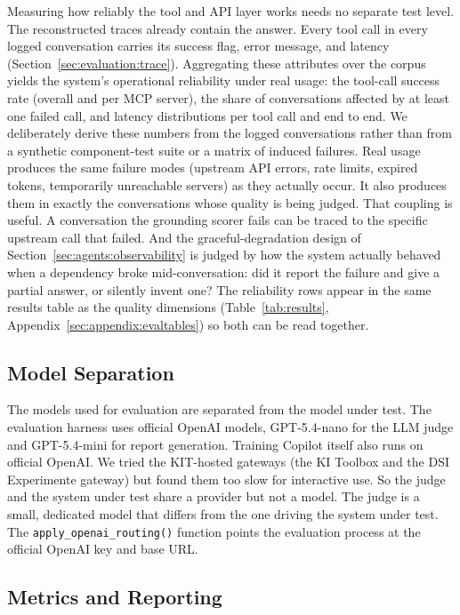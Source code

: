 Measuring how reliably the tool and API layer works needs no separate test level. The reconstructed traces already contain the answer. Every tool call in every logged conversation carries its success flag, error message, and latency (Section~\ref{sec:evaluation:trace}). Aggregating these attributes over the corpus yields the system's operational reliability under real usage: the tool-call success rate (overall and per MCP server), the share of conversations affected by at least one failed call, and latency distributions per tool call and end to end. We deliberately derive these numbers from the logged conversations rather than from a synthetic component-test suite or a matrix of induced failures. Real usage produces the same failure modes (upstream API errors, rate limits, expired tokens, temporarily unreachable servers) as they actually occur. It also produces them in exactly the conversations whose quality is being judged. That coupling is useful. A conversation the grounding scorer fails can be traced to the specific upstream call that failed. And the graceful-degradation design of Section~\ref{sec:agents:observability} is judged by how the system actually behaved when a dependency broke mid-conversation: did it report the failure and give a partial answer, or silently invent one? The reliability rows appear in the same results table as the quality dimensions (Table~\ref{tab:results}, Appendix~\ref{sec:appendix:evaltables}) so both can be read together.

\subsection{Model Separation}\label{sec:evaluation:models}

The models used for evaluation are separated from the model under test. The evaluation harness uses official OpenAI models, GPT-5.4-nano for the LLM judge and GPT-5.4-mini for report generation. Training Copilot itself also runs on official OpenAI. We tried the KIT-hosted gateways (the KI Toolbox and the DSI Experimente gateway) but found them too slow for interactive use. So the judge and the system under test share a provider but not a model. The judge is a small, dedicated model that differs from the one driving the system under test. The \texttt{apply\_openai\_routing()} function points the evaluation process at the official OpenAI key and base URL.

\subsection{Metrics and Reporting}\label{sec:evaluation:metrics}

